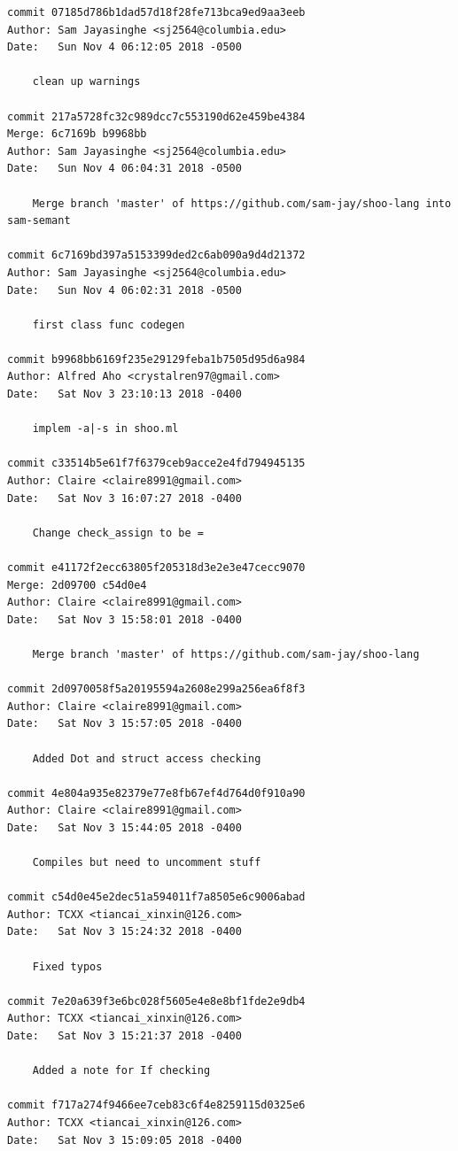\documentclass[12pt]{article}
\begin{document}
\begin{lstlisting}
commit 07185d786b1dad57d18f28fe713bca9ed9aa3eeb
Author: Sam Jayasinghe <sj2564@columbia.edu>
Date:   Sun Nov 4 06:12:05 2018 -0500

    clean up warnings

commit 217a5728fc32c989dcc7c553190d62e459be4384
Merge: 6c7169b b9968bb
Author: Sam Jayasinghe <sj2564@columbia.edu>
Date:   Sun Nov 4 06:04:31 2018 -0500

    Merge branch 'master' of https://github.com/sam-jay/shoo-lang into sam-semant

commit 6c7169bd397a5153399ded2c6ab090a9d4d21372
Author: Sam Jayasinghe <sj2564@columbia.edu>
Date:   Sun Nov 4 06:02:31 2018 -0500

    first class func codegen

commit b9968bb6169f235e29129feba1b7505d95d6a984
Author: Alfred Aho <crystalren97@gmail.com>
Date:   Sat Nov 3 23:10:13 2018 -0400

    implem -a|-s in shoo.ml

commit c33514b5e61f7f6379ceb9acce2e4fd794945135
Author: Claire <claire8991@gmail.com>
Date:   Sat Nov 3 16:07:27 2018 -0400

    Change check_assign to be =

commit e41172f2ecc63805f205318d3e2e3e47cecc9070
Merge: 2d09700 c54d0e4
Author: Claire <claire8991@gmail.com>
Date:   Sat Nov 3 15:58:01 2018 -0400

    Merge branch 'master' of https://github.com/sam-jay/shoo-lang

commit 2d0970058f5a20195594a2608e299a256ea6f8f3
Author: Claire <claire8991@gmail.com>
Date:   Sat Nov 3 15:57:05 2018 -0400

    Added Dot and struct access checking

commit 4e804a935e82379e77e8fb67ef4d764d0f910a90
Author: Claire <claire8991@gmail.com>
Date:   Sat Nov 3 15:44:05 2018 -0400

    Compiles but need to uncomment stuff

commit c54d0e45e2dec51a594011f7a8505e6c9006abad
Author: TCXX <tiancai_xinxin@126.com>
Date:   Sat Nov 3 15:24:32 2018 -0400

    Fixed typos

commit 7e20a639f3e6bc028f5605e4e8e8bf1fde2e9db4
Author: TCXX <tiancai_xinxin@126.com>
Date:   Sat Nov 3 15:21:37 2018 -0400

    Added a note for If checking

commit f717a274f9466ee7ceb83c6f4e8259115d0325e6
Author: TCXX <tiancai_xinxin@126.com>
Date:   Sat Nov 3 15:09:05 2018 -0400


\end{lstlisting}
\end{document}
